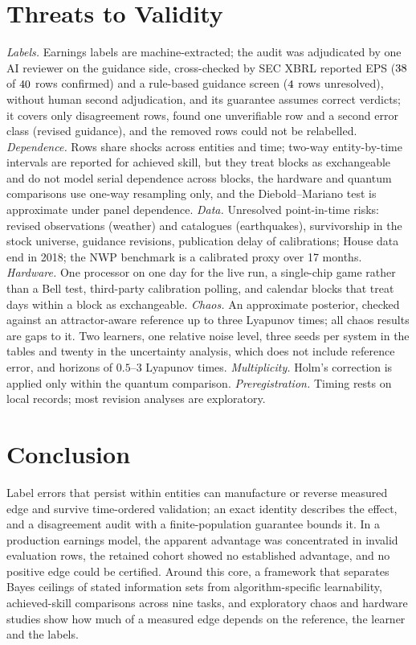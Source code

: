 \documentclass[journal]{IEEEtran}
\theoremstyle{definition}
\begin{document}
\section{Threats to Validity}\label{sec:threats}
\emph{Labels.} Earnings labels are machine-extracted; the audit was adjudicated by one AI reviewer on the guidance side, cross-checked by SEC XBRL reported EPS ($38$ of $40$ rows confirmed) and a rule-based guidance screen ($4$ rows unresolved), without human second adjudication, and its guarantee assumes correct verdicts; it covers only disagreement rows, found one unverifiable row and a second error class (revised guidance), and the removed rows could not be relabelled. \emph{Dependence.} Rows share shocks across entities and time; two-way entity-by-time intervals are reported for achieved skill, but they treat blocks as exchangeable and do not model serial dependence across blocks, the hardware and quantum comparisons use one-way resampling only, and the Diebold--Mariano test is approximate under panel dependence. \emph{Data.} Unresolved point-in-time risks: revised observations (weather) and catalogues (earthquakes), survivorship in the stock universe, guidance revisions, publication delay of calibrations; House data end in 2018; the NWP benchmark is a calibrated proxy over 17 months. \emph{Hardware.} One processor on one day for the live run, a single-chip game rather than a Bell test, third-party calibration polling, and calendar blocks that treat days within a block as exchangeable. \emph{Chaos.} An approximate posterior, checked against an attractor-aware reference up to three Lyapunov times; all chaos results are gaps to it. Two learners, one relative noise level, three seeds per system in the tables and twenty in the uncertainty analysis, which does not include reference error, and horizons of $0.5$--$3$ Lyapunov times. \emph{Multiplicity.} Holm's correction is applied only within the quantum comparison. \emph{Preregistration.} Timing rests on local records; most revision analyses are exploratory.

\section{Conclusion}
Label errors that persist within entities can manufacture or reverse measured edge and survive time-ordered validation; an exact identity describes the effect, and a disagreement audit with a finite-population guarantee bounds it. In a production earnings model, the apparent advantage was concentrated in invalid evaluation rows, the retained cohort showed no established advantage, and no positive edge could be certified. Around this core, a framework that separates Bayes ceilings of stated information sets from algorithm-specific learnability, achieved-skill comparisons across nine tasks, and exploratory chaos and hardware studies show how much of a measured edge depends on the reference, the learner and the labels.
\end{document}
